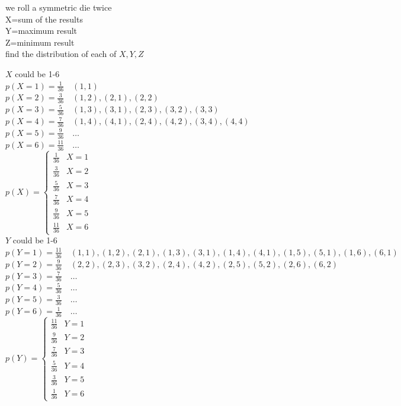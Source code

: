 \documentclass[a4paper,12pt]{article}
\begin{document}
\begin{question}
we roll a symmetric die twice\\
X=sum of the results\\
Y=maximum result\\
Z=minimum result\\
find the distribution of each of \(X,Y,Z\)\\
\begin{answer}
\(X\) could be 1-6\\
\(p(X=1)=\frac{1}{36} \quad (1,1)\)\\
\(p(X=2)=\frac{3}{36} \quad (1,2),(2,1),(2,2)\)\\
\(p(X=3)=\frac{5}{36} \quad (1,3),(3,1),(2,3),(3,2),(3,3)\)\\
\(p(X=4)=\frac{7}{36} \quad (1,4),(4,1),(2,4),(4,2),(3,4),(4,4)\)\\
\(p(X=5)=\frac{9}{36} \quad \dots\)\\
\(p(X=6)=\frac{11}{36} \quad \dots\)\\
\(p(X) = \begin{cases} \frac{1}{36} & X=1\\ \frac{3}{36} & X=2\\ \frac{5}{36} & X=3\\ \frac{7}{36} & X=4\\ \frac{9}{36} & X=5\\ \frac{11}{36} & X=6 \end{cases}\)\\
\(Y\) could be 1-6\\
\(p(Y=1)=\frac{11}{36} \quad (1,1),(1,2),(2,1),(1,3),(3,1),(1,4),(4,1),(1,5),(5,1),(1,6),(6,1)\)\\
\(p(Y=2)=\frac{9}{36} \quad (2,2),(2,3),(3,2),(2,4),(4,2),(2,5),(5,2),(2,6),(6,2)\)\\
\(p(Y=3)=\frac{7}{36} \quad \dots\)\\
\(p(Y=4)=\frac{5}{36} \quad \dots\)\\
\(p(Y=5)=\frac{3}{36} \quad \dots\)\\
\(p(Y=6)=\frac{1}{36} \quad \dots\)\\
\(p(Y) = \begin{cases} \frac{11}{36} & Y=1\\ \frac{9}{36} & Y=2\\ \frac{7}{36} & Y=3\\ \frac{5}{36} & Y=4\\ \frac{3}{36} & Y=5\\ \frac{1}{36} & Y=6 \end{cases}\)\\

\end{answer}
\end{question}
\end{document}
